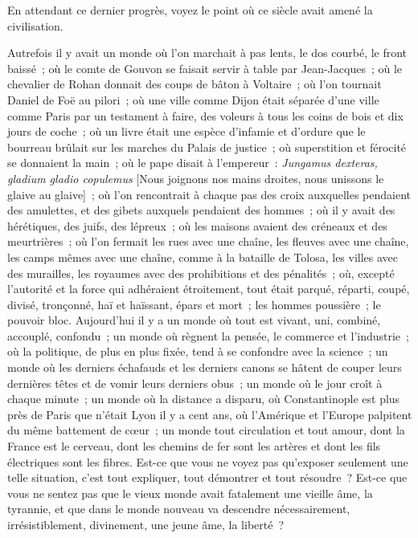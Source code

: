 \documentclass[french,twoside]{book} %
\begin{document}
En attendant ce dernier progrès, voyez le point où ce siècle avait amené la civilisation.\par
Autrefois il y avait un monde où l’on marchait à pas lents, le dos courbé, le front baissé ; où le comte de Gouvon se faisait servir à table par Jean-Jacques ; où le chevalier de Rohan donnait des coups de bâton à Voltaire ; où l’on tournait Daniel de Foë au pilori ; où une ville comme Dijon était séparée d’une ville comme Paris par un testament à faire, des voleurs à tous les coins de bois et dix jours de coche ; où un livre était une espèce d’infamie et d’ordure que le bourreau brûlait sur les marches du Palais de justice ; où superstition et férocité se donnaient la main ; où le pape disait à l’empereur : \emph{Jungamus dexteras, gladium gladio copulemus} [Nous joignons nos mains droites, nous unissons le glaive au glaive] ; où l’on rencontrait à chaque pas des croix auxquelles pendaient des amulettes, et des gibets auxquels pendaient des hommes ; où il y avait des hérétiques, des juifs, des lépreux ; où les maisons avaient des créneaux et des meurtrières ; où l’on fermait les rues avec une chaîne, les fleuves avec une chaîne, les camps mêmes avec une chaîne, comme à la bataille de Tolosa, les villes avec des murailles, les royaumes avec des prohibitions et des pénalités ; où, excepté l’autorité et la force qui adhéraient étroitement, tout était parqué, réparti, coupé, divisé, tronçonné, haï et haïssant, épars et mort ; les hommes poussière ; le pouvoir bloc. Aujourd’hui il y a un monde où tout est vivant, uni, combiné, accouplé, confondu ; un monde où règnent la pensée, le commerce et l’industrie ; où la politique, de plus en plus fixée, tend à se confondre avec la science ; un monde où les derniers échafauds et les derniers canons se hâtent de couper leurs dernières têtes et de vomir leurs derniers obus ; un monde où le jour croît à chaque minute ; un monde où la distance a disparu, où Constantinople est plus près de Paris que n’était Lyon il y a cent ans, où l’Amérique et l’Europe palpitent du même battement de cœur ; un monde tout circulation et tout amour, dont la France est le cerveau, dont les chemins de fer sont les artères et dont les fils électriques sont les fibres. Est-ce que vous ne voyez pas qu’exposer seulement une telle situation, c’est tout expliquer, tout démontrer et tout résoudre ? Est-ce que vous ne sentez pas que le vieux monde avait fatalement une vieille âme, la tyrannie, et que dans le monde nouveau va descendre nécessairement, irrésistiblement, divinement, une jeune âme, la liberté ?\par
\end{document}
